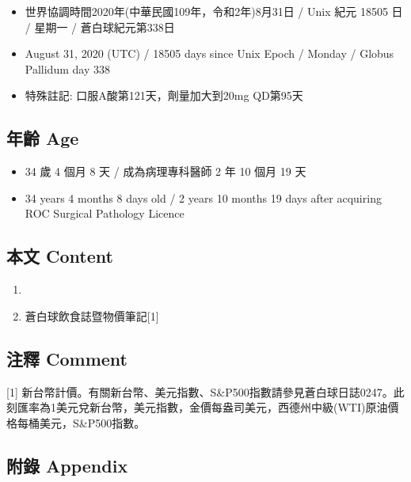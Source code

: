 \documentclass[a5paper, 11pt
]{book}
\providecommand{\tightlist}{%
  \setlength{\itemsep}{0pt}\setlength{\parskip}{0pt}}
\begin{document}
\begin{itemize}
\tightlist
\item
  世界協調時間2020年(中華民國109年，令和2年)8月31日 / Unix 紀元 18505 日
  / 星期一 / 蒼白球紀元第338日
\item
  August 31, 2020 (UTC) / 18505 days since Unix Epoch / Monday / Globus
  Pallidum day 338
\item
  特殊註記: 口服A酸第121天，劑量加大到20mg QD第95天
\end{itemize}

\hypertarget{ux5e74ux9f61-age-91}{%
\subsection{年齡 Age}\label{ux5e74ux9f61-age-91}}

\begin{itemize}
\tightlist
\item
  34 歲 4 個月 8 天 / 成為病理專科醫師 2 年 10 個月 19 天
\item
  34 years 4 months 8 days old / 2 years 10 months 19 days after
  acquiring ROC Surgical Pathology Licence
\end{itemize}

\hypertarget{ux672cux6587-content-91}{%
\subsection{本文 Content}\label{ux672cux6587-content-91}}

\begin{enumerate}
\def\labelenumi{\arabic{enumi}.}
\tightlist
\item
\item
  蒼白球飲食誌暨物價筆記{[}1{]}
\end{enumerate}

\hypertarget{ux6ce8ux91cb-comment-91}{%
\subsection{注釋 Comment}\label{ux6ce8ux91cb-comment-91}}

{[}1{]}
新台幣計價。有關新台幣、美元指數、S\&P500指數請參見蒼白球日誌0247。此刻匯率為1美元兌新台幣，美元指數，金價每盎司美元，西德州中級(WTI)原油價格每桶美元，S\&P500指數。

\hypertarget{ux9644ux9304-appendix-91}{%
\subsection{附錄 Appendix}\label{ux9644ux9304-appendix-91}}
\end{document}
